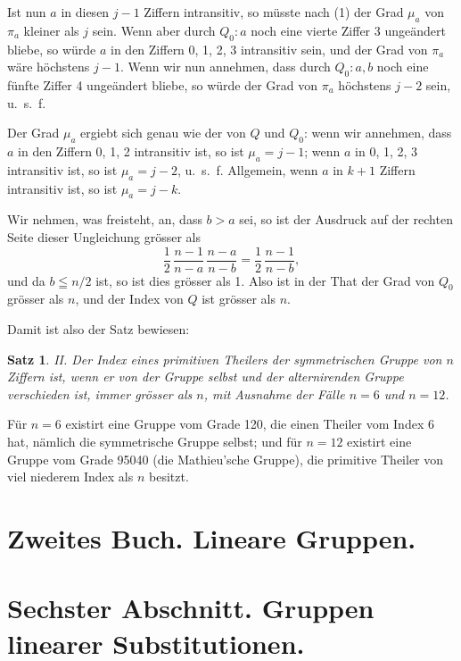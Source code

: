\documentclass[12pt,a4paper]{article}
\theoremstyle{plain}
\newtheorem{satz}{Satz}[section]
\theoremstyle{definition}
\theoremstyle{remark}
\begin{document}
Ist nun $a$ in diesen $j-1$ Ziffern intransitiv, so müsste nach (1) der Grad $\mu_{a}$ von $\pi_{a}$ kleiner als $j$ sein. Wenn aber durch $Q_{0}: a$ noch eine vierte Ziffer 3 ungeändert bliebe, so würde $a$ in den Ziffern 0, 1, 2, 3 intransitiv sein, und der Grad von $\pi_{a}$ wäre höchstens $j-1$. Wenn wir nun annehmen, dass durch $Q_{0}: a, b$ noch eine fünfte Ziffer 4 ungeändert bliebe, so würde der Grad von $\pi_{a}$ höchstens $j-2$ sein, u.~s.~f.

Der Grad $\mu_{a}$ ergiebt sich genau wie der von $Q$ und $Q_{0}$: wenn wir annehmen, dass $a$ in den Ziffern 0, 1, 2 intransitiv ist, so ist $\mu_{a} = j - 1$; wenn $a$ in 0, 1, 2, 3 intransitiv ist, so ist $\mu_{a} = j - 2$, u.~s.~f. Allgemein, wenn $a$ in $k+1$ Ziffern intransitiv ist, so ist $\mu_{a} = j - k$.

Wir nehmen, was freisteht, an, dass $b > a$ sei, so ist der Ausdruck auf der rechten Seite dieser Ungleichung grösser als
\[
\frac{1}{2}\,\frac{n-1}{n-a}\,\frac{n-a}{n-b} = \frac{1}{2}\,\frac{n-1}{n-b},
\]
und da $b \leqq n/2$ ist, so ist dies grösser als 1. Also ist in der That der Grad von $Q_{0}$ grösser als $n$, und der Index von $Q$ ist grösser als $n$.

Damit ist also der Satz bewiesen:

\begin{satz}
II. Der Index eines primitiven Theilers der symmetrischen Gruppe von $n$ Ziffern ist, wenn er von der Gruppe selbst und der alternirenden Gruppe verschieden ist, immer grösser als $n$, mit Ausnahme der Fälle $n = 6$ und $n = 12$.
\end{satz}

Für $n = 6$ existirt eine Gruppe vom Grade 120, die einen Theiler vom Index 6 hat, nämlich die symmetrische Gruppe selbst; und für $n = 12$ existirt eine Gruppe vom Grade 95040 (die Mathieu'sche Gruppe), die primitive Theiler von viel niederem Index als $n$ besitzt.


\newpage
\section*{Zweites Buch. Lineare Gruppen.}

\section*{Sechster Abschnitt. Gruppen linearer Substitutionen.}
\end{document}
